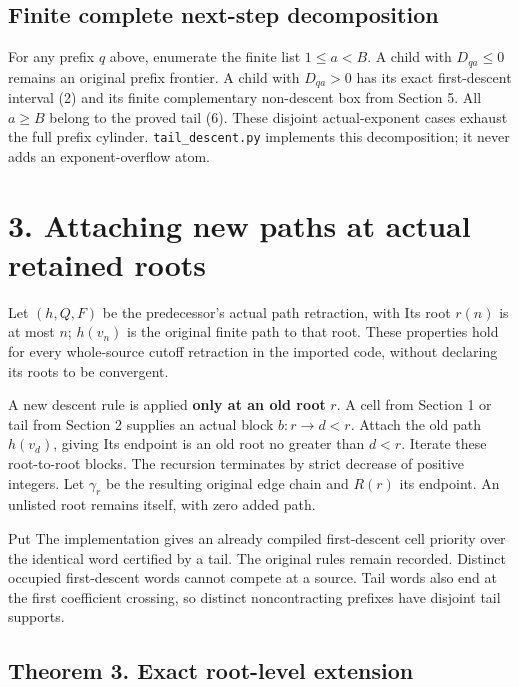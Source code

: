 \subsection{Finite complete next-step decomposition}

For any prefix \(q\) above, enumerate the finite list \(1\le a<B\). A
child with \(D_{qa}\le0\) remains an original prefix frontier. A child
with \(D_{qa}>0\) has its exact first-descent interval (2) and its
finite complementary non-descent box from Section 5. All \(a\ge B\)
belong to the proved tail (6). These disjoint actual-exponent cases
exhaust the full prefix cylinder. \nolinkurl{tail_descent.py} implements
this decomposition; it never adds an exponent-overflow atom.

\section{3. Attaching new paths at actual retained roots}

Let \((h,Q,F)\) be the predecessor's actual path retraction, with
Its root \(r(n)\) is at most \(n\); \(h(v_n)\) is the original finite
path to that root. These properties hold for every whole-source cutoff
retraction in the imported code, without declaring its roots to be
convergent.

A new descent rule is applied \textbf{only at an old root} \(r\). A cell
from Section 1 or tail from Section 2 supplies an actual block
\(b:r\to d<r\). Attach the old path \(h(v_d)\), giving
 Its endpoint is an old root no
greater than \(d<r\). Iterate these root-to-root blocks. The recursion
terminates by strict decrease of positive integers. Let \(\gamma_r\) be
the resulting original edge chain and \(R(r)\) its endpoint. An unlisted
root remains itself, with zero added path.

Put
 The implementation gives an already compiled
first-descent cell priority over the identical word certified by a tail.
The original rules remain recorded. Distinct occupied first-descent
words cannot compete at a source. Tail words also end at the first
coefficient crossing, so distinct noncontracting prefixes have disjoint
tail supports.

\subsection{Theorem 3. Exact root-level extension}

